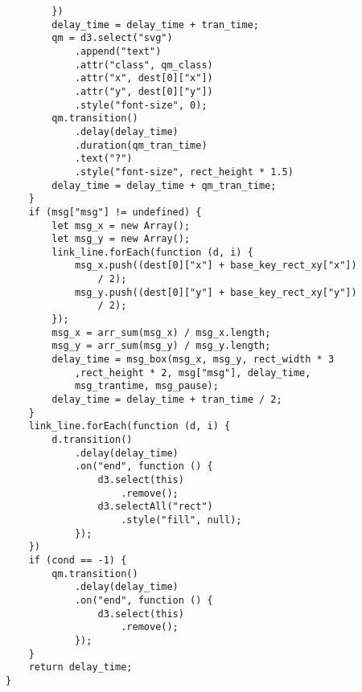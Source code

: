 \begin{lstlisting}
        })
        delay_time = delay_time + tran_time;
        qm = d3.select("svg")
            .append("text")
            .attr("class", qm_class)
            .attr("x", dest[0]["x"])
            .attr("y", dest[0]["y"])
            .style("font-size", 0);
        qm.transition()
            .delay(delay_time)
            .duration(qm_tran_time)
            .text("?")
            .style("font-size", rect_height * 1.5)
        delay_time = delay_time + qm_tran_time;
    }
    if (msg["msg"] != undefined) {
        let msg_x = new Array();
        let msg_y = new Array();
        link_line.forEach(function (d, i) {
            msg_x.push((dest[0]["x"] + base_key_rect_xy["x"])
                / 2);
            msg_y.push((dest[0]["y"] + base_key_rect_xy["y"]) 
                / 2);
        });
        msg_x = arr_sum(msg_x) / msg_x.length;
        msg_y = arr_sum(msg_y) / msg_y.length;
        delay_time = msg_box(msg_x, msg_y, rect_width * 3
            ,rect_height * 2, msg["msg"], delay_time, 
            msg_trantime, msg_pause);
        delay_time = delay_time + tran_time / 2;
    }
    link_line.forEach(function (d, i) {
        d.transition()
            .delay(delay_time)
            .on("end", function () {
                d3.select(this)
                    .remove();
                d3.selectAll("rect")
                    .style("fill", null);
            });
    })
    if (cond == -1) {
        qm.transition()
            .delay(delay_time)
            .on("end", function () {
                d3.select(this)
                    .remove();
            });
    }
    return delay_time;
}


\end{lstlisting}
